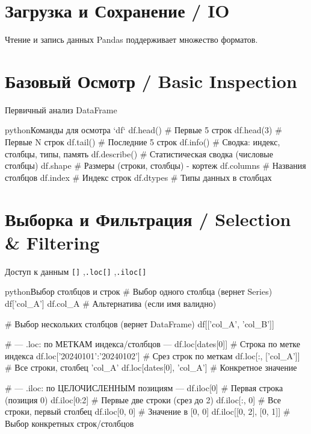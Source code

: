 \section{Загрузка и Сохранение / IO}
\begin{myblock}{Чтение и запись данных}
Pandas поддерживает множество форматов.
\end{myblock}

\section{Базовый Осмотр / Basic Inspection}
\begin{textbox}{Первичный анализ DataFrame}
\begin{codebox}{python}{Команды для осмотра `df`}
df.head()       # Первые 5 строк
df.head(3)      # Первые N строк
df.tail()       # Последние 5 строк
df.info()       # Сводка: индекс, столбцы, типы, память
df.describe()   # Статистическая сводка (числовые столбцы)
df.shape        # Размеры (строки, столбцы) - кортеж
df.columns      # Названия столбцов
df.index        # Индекс строк
df.dtypes       # Типы данных в столбцах
\end{codebox}
\end{textbox}

\section{Выборка и Фильтрация / Selection \& Filtering}
\begin{textbox}{Доступ к данным}
 \texttt{[]} \sep \texttt{.loc[]} \sep \texttt{.iloc[]}

\begin{codebox}{python}{Выбор столбцов и строк}
# Выбор одного столбца (вернет Series)
df['col_A']
df.col_A # Альтернатива (если имя валидно)

# Выбор нескольких столбцов (вернет DataFrame)
df[['col_A', 'col_B']]

# --- .loc: по МЕТКАМ индекса/столбцов ---
df.loc[dates[0]]              # Строка по метке индекса
df.loc['20240101':'20240102'] # Срез строк по меткам
df.loc[:, ['col_A']]          # Все строки, столбец 'col_A'
df.loc[dates[0], 'col_A']     # Конкретное значение

# --- .iloc: по ЦЕЛОЧИСЛЕННЫМ позициям ---
df.iloc[0]          # Первая строка (позиция 0)
df.iloc[0:2]        # Первые две строки (срез до 2)
df.iloc[:, 0]       # Все строки, первый столбец
df.iloc[0, 0]       # Значение в [0, 0]
df.iloc[[0, 2], [0, 1]] # Выбор конкретных строк/столбцов
\end{codebox}
\end{textbox}

